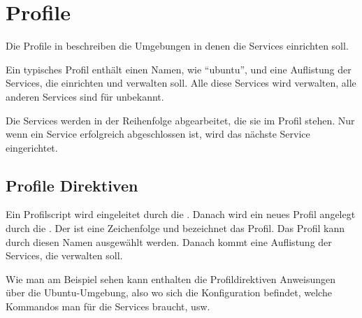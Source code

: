 \section{Profile}

Die Profile in \sscontrol{} beschreiben die Umgebungen in denen \sscontrol{} die
Services einrichten soll.

Ein typisches Profil enthält einen Namen, wie ``ubuntu'', und eine Auflistung
der Services, die \sscontrol{} einrichten und verwalten soll. Alle diese
Services wird \sscontrol{} verwalten, alle anderen Services sind für
\sscontrol{} unbekannt.

Die Services werden in der Reihenfolge abgearbeitet, die sie im Profil stehen.
Nur wenn ein Service erfolgreich abgeschlossen ist, wird das nächste Service eingerichtet.

\subsection{Profile Direktiven}

Ein Profilscript wird eingeleitet durch die .
Danach wird ein neues Profil angelegt durch die
. Der  ist eine Zeichenfolge und
bezeichnet das Profil. Das Profil kann durch diesen Namen ausgewählt werden. 
Danach kommt eine Auflistung der
Services, die \sscontrol{} verwalten soll.

Wie man am Beispiel sehen kann enthalten die Profildirektiven Anweisungen
über die Ubuntu-Umgebung, also wo sich die Konfiguration befindet, welche
Kommandos man für die Services braucht, usw.

